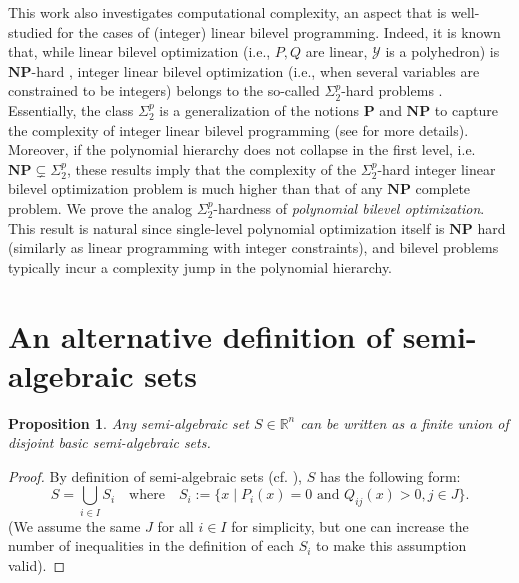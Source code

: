 \documentclass{article}
\newcommand*{\cT}{\mathcal{T}}
\newcommand*{\cY}{\mathcal{Y}}
\newcommand*{\RR}{\mathbb{R}}
\newcommand{\existleveltwo}{\Sigma_2^p}
\theoremstyle{plain}
\newtheorem{proposition}[theorem]{Proposition}
\theoremstyle{definition}
\begin{document}
\begin{appendices}
This work also investigates computational complexity, an aspect that is well-studied for the cases of (integer) linear bilevel programming. Indeed, it is known that, while linear bilevel optimization (i.e., $P,Q$ are linear, $\cY$ is a polyhedron) is $\textbf{NP}$-hard \cite{jeroslow1985polynomial,bard1991property,ben-ayed1990computational}, integer linear bilevel optimization (i.e., when several variables are constrained to be integers) belongs to the so-called $\existleveltwo$-hard problems  \cite{lodi2013bilevel,caprara2014study,jeroslow1985polynomial}. Essentially, the class $\existleveltwo$ is a generalization of the notions $\textbf{P}$ and $\textbf{NP}$ to capture the complexity of integer linear bilevel programming (see  for more details).
Moreover, if the polynomial hierarchy does not collapse in the first level, i.e. $\textbf{NP} \subsetneq \existleveltwo$, these results imply that the complexity of the $\existleveltwo$-hard integer linear bilevel optimization problem is much higher than that of any $\textbf{NP}$ complete problem. We prove the analog $\existleveltwo$-hardness of \emph{polynomial bilevel optimization}. This result is natural since single-level polynomial optimization itself is $\textbf{NP}$ hard (similarly as linear programming with integer constraints), and bilevel problems typically incur a complexity jump in the polynomial hierarchy.

\section{An alternative definition of semi-algebraic sets}\label{appendix:alternative-def}

\begin{proposition}    
    \label{lemma:stratification-elementary-set}
    Any semi-algebraic set $S \in \RR^n$ can be written as a finite union of disjoint basic semi-algebraic sets.
\end{proposition}

\begin{proof}
    By definition of semi-algebraic sets (cf. ), $S$ has the following form:
    \begin{equation}
        \label{eq:decomposition-si}
        S = \bigcup_{i \in I}  S_i \quad \text{where} \quad S_i:= \{x \mid P_i(x) = 0 \text{ and } Q_{ij}(x) > 0, j \in J\}.
    \end{equation}
    (We assume the same $J$ for all $i \in I$ for simplicity, but one can increase the number of inequalities in the definition of each $S_i$ to make this assumption valid).


\end{proof}
\end{appendices}
\end{document}
